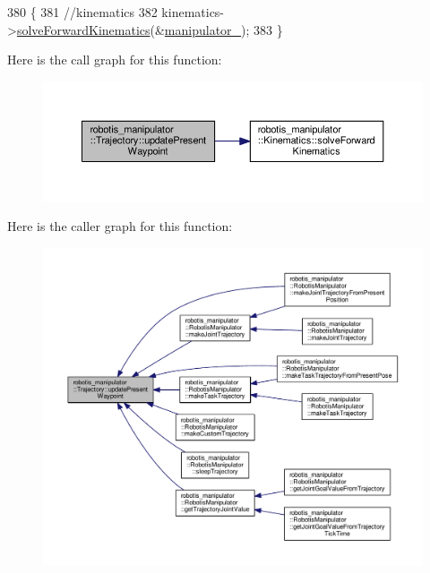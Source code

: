 \begin{DoxyCode}
380 \{
381   \textcolor{comment}{//kinematics}
382   kinematics->\hyperlink{classrobotis__manipulator_1_1_kinematics_adfdd3727052c27d12e3fc2209c025317}{solveForwardKinematics}(&\hyperlink{classrobotis__manipulator_1_1_trajectory_acd9fd9ae6cc065a10d9d438cda1081de}{manipulator\_});
383 \}
\end{DoxyCode}


Here is the call graph for this function\+:\nopagebreak
\begin{figure}[H]
\begin{center}
\leavevmode
\includegraphics[width=350pt]{classrobotis__manipulator_1_1_trajectory_a05e95f1473723592130f63321664fb0c_cgraph}
\end{center}
\end{figure}




Here is the caller graph for this function\+:\nopagebreak
\begin{figure}[H]
\begin{center}
\leavevmode
\includegraphics[width=350pt]{classrobotis__manipulator_1_1_trajectory_a05e95f1473723592130f63321664fb0c_icgraph}
\end{center}
\end{figure}




